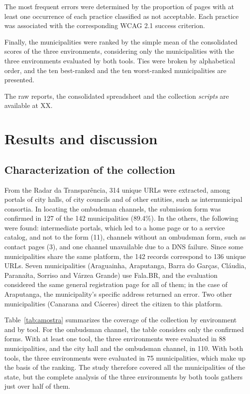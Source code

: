 \documentclass[12pt]{article}
\begin{document}
The most frequent errors were determined by the proportion of pages with at least one occurrence of each practice classified as not acceptable. Each practice was associated with the corresponding WCAG 2.1 success criterion.

Finally, the municipalities were ranked by the simple mean of the consolidated scores of the three environments, considering only the municipalities with the three environments evaluated by both tools. Ties were broken by alphabetical order, and the ten best-ranked and the ten worst-ranked municipalities are presented.

The raw reports, the consolidated spreadsheet and the collection \textit{scripts} are available at XX.


\section{Results and discussion}
\label{sec:resultados}

\subsection{Characterization of the collection}

From the Radar da Transparência, 314 unique URLs were extracted, among portals of city halls, of city councils and of other entities, such as intermunicipal consortia. In locating the ombudsman channels, the submission form was confirmed in 127 of the 142 municipalities (89.4\%). In the others, the following were found: intermediate portals, which led to a home page or to a service catalog, and not to the form (11), channels without an ombudsman form, such as contact pages (3), and one channel unavailable due to a DNS failure. Since some municipalities share the same platform, the 142 records correspond to 136 unique URLs. Seven municipalities (Araguainha, Araputanga, Barra do Garças, Cláudia, Paranaíta, Sorriso and Várzea Grande) use Fala.BR, and the evaluation considered the same general registration page for all of them; in the case of Araputanga, the municipality's specific address returned an error. Two other municipalities (Canarana and Cáceres) direct the citizen to this platform.

Table~\ref{tab:amostra} summarizes the coverage of the collection by environment and by tool. For the ombudsman channel, the table considers only the confirmed forms. With at least one tool, the three environments were evaluated in 88 municipalities, and the city hall and the ombudsman channel, in 110. With both tools, the three environments were evaluated in 75 municipalities, which make up the basis of the ranking. The study therefore covered all the municipalities of the state, but the complete analysis of the three environments by both tools gathers just over half of them.
\end{document}
